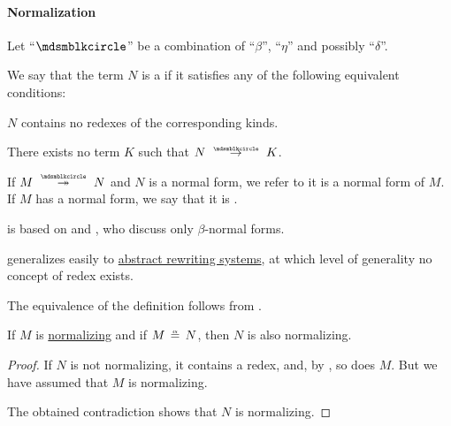 \paragraph{Normalization}

\begin{definition}\label{def:lambda_term_normal_form}\mimprovised
  Let \enquote{\( {\Anon} \)} be a combination of \enquote{\( \beta \)}, \enquote{\( \eta \)} and possibly \enquote{\( \delta \)}.

  We say that the term \( N \) is a  if it satisfies any of the following equivalent conditions:
  \begin{thmenum}
     \( N \) contains no redexes of the corresponding kinds.

     There exists no term \( K \) such that \( N \pred K \).
  \end{thmenum}

  If \( M \pred* N \) and \( N \) is a normal form, we refer to it is a normal form of \( M \). If \( M \) has a normal form, we say that it is .
\end{definition}
\begin{comments}
  \item {} is based on  and , who discuss only \( \beta \)-normal forms.

  \item {} generalizes easily to \hyperref[def:rewriting_system]{abstract rewriting systems}, at which level of generality no concept of redex exists.
\end{comments}
\begin{defproof}
  The equivalence of the definition follows from .
\end{defproof}

\begin{proposition}\label{thm:normalization_of_alpha_equivalent_term}
  If \( M \) is \hyperref[def:lambda_term_normal_form]{normalizing} and if \( M \aequiv N \), then \( N \) is also normalizing.
\end{proposition}
\begin{proof}
  If \( N \) is not normalizing, it contains a redex, and, by , so does \( M \). But we have assumed that \( M \) is normalizing.

  The obtained contradiction shows that \( N \) is normalizing.
\end{proof}

